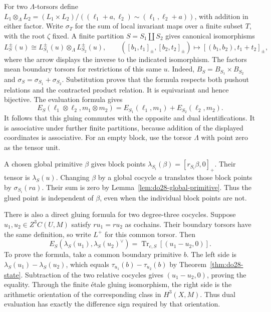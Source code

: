 For two \(\Lambda\)-torsors define
\(L_1\otimes_\Lambda L_2=(L_1\times L_2)/((\ell_1+a,\ell_2)\sim
(\ell_1,\ell_2+a))\), with addition in either factor.
Write \(\sigma_T\) for the sum of local invariant maps over a
finite subset \(T\), with the root \(\zeta\) fixed.
A finite partition \(S=S_1\amalg S_2\) gives canonical isomorphisms
\begin{equation}
\label{eq:do28-block-gluing}
 L_S^\pm(u)\cong L_{S_1}^\pm(u)\otimes_\Lambda L_{S_2}^\pm(u),
 \qquad
 ([b_1,t_1]_\pm,[b_2,t_2]_\pm)\longmapsto
       [(b_1,b_2),t_1+t_2]_\pm,
\end{equation}
where the arrow displays the inverse to the indicated isomorphism.
The factors mean boundary torsors for restrictions of this same \(u\).
Indeed, \(B_S=B_{S_1}\times B_{S_2}\) and
\(\sigma_S=\sigma_{S_1}+\sigma_{S_2}\). Substitution proves that
the formula respects both pushout relations and the contracted
product relation. It is equivariant and hence bijective.
The evaluation formula gives
\[
 E_S(\ell_1\otimes\ell_2,m_1\otimes m_2)
   =E_{S_1}(\ell_1,m_1)+E_{S_2}(\ell_2,m_2).
\]
It follows that this gluing commutes with the opposite and dual
identifications. It is associative under further finite partitions,
because addition of the displayed coordinates is associative.
For an empty block, use the torsor \(\Lambda\) with point zero as
the tensor unit.

A chosen global primitive \(\beta\) gives block points
\(\lambda_{S_i}(\beta)=[r_{S_i}\beta,0]_+\).
Their tensor is \(\lambda_S(u)\).
Changing \(\beta\) by a global cocycle \(a\) translates those
block points by \(\sigma_{S_i}(r a)\). Their sum is zero by
Lemma~\ref{lem:do28-global-primitive}. Thus the glued point is
independent of \(\beta\), even when the individual block points
are not.

There is also a direct gluing formula for two degree-three cocycles.
Suppose \(u_1,u_2\in Z^3C(U,M)\) satisfy \(r u_1=r u_2\) as
cochains. Their boundary torsors have the same definition, so write
\(L^+\) for this common torsor. Then
\begin{equation}
\label{eq:do28-difference-gluing}
 E_S(\lambda_S(u_1),\lambda_S(u_2)^\vee)
   =\operatorname{Tr}_{c,S}[(u_1-u_2,0)].
\end{equation}
To prove the formula, take a common boundary primitive \(b\).
The left side is \(\lambda_S(u_1)-\lambda_S(u_2)\), which equals
\(\tau_{u_1}(b)-\tau_{u_2}(b)\) by
Theorem~\ref{thm:do28-state}. Subtraction of the two relative
cocycles gives \((u_1-u_2,0)\), proving the equality.
Through the finite \'etale gluing isomorphism, the right side is the
arithmetic orientation of the corresponding class in \(H^3(X,M)\).
Thus dual evaluation has exactly the difference sign required by
that orientation.

